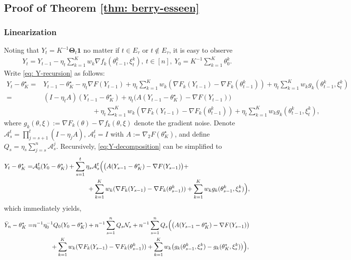 \documentclass[a4paper,11pt]{article}
\numberwithin{equation}{section}
\theoremstyle{plain}
\theoremstyle{remark}
\def\bo{\mathbf{1}}
\def\bT{\mathbf{\Theta}}
\newcommand{\minparam}{\theta^\star_K}
\begin{document}
\subsection{Proof of Theorem \ref{thm: berry-esseen}} \label{se:proof_thm_2.1}

\subsubsection{Linearization} \label{se:linearization}
Noting that $Y_t=K^{-1}\bT_t\bo$ no matter if $t\in E_\tau$ or $t\notin E_\tau$, it is easy to observe
   \begin{align} \label{eq: Y-recursion}
       Y_t = Y_{t-1} - \eta_t \sum_{k=1}^K w_k \nabla f_k(\theta_{t-1}^k, \xi_t^k), \ t\in [n], \ Y_0 =K^{-1}\sum_{k=1}^K \theta_0^k.
   \end{align}
   Write \eqref{eq: Y-recursion} as follows:
   \begin{align} \label{eq:Y-decomposition}
       Y_t - \minparam =& Y_{t-1} - \minparam - \eta_t \nabla F(Y_{t-1}) +\eta_t\sum_{k=1}^K w_k(\nabla F_k(Y_{t-1}) - \nabla F_k(\theta_{t-1}^k)) + \eta_t\sum_{k=1}^K w_k g_k(\theta_{t-1}^k, \xi_t^k) \nonumber \\
        =& (I - \eta_t A)(Y_{t-1} - \minparam) + \eta_t\big(A(Y_{t-1} - \minparam) - \nabla F(Y_{t-1})\big) \nonumber\\
    & \hspace{3cm} + \eta_t \sum_{k=1}^K w_k (\nabla F_k(Y_{t-1}) - \nabla F_k(\theta_{t-1}^k))  + \eta_t \sum_{k=1}^K w_k g_k(\theta_{t-1}^k, \xi_t^k),
   \end{align}
   where $g_k(\theta, \xi):=\nabla F_k(\theta)-\nabla f_k(\theta, \xi)$ denote the gradient noise. Denote $\mathcal{A}_s^t=\prod_{j=s+1}^t (I-\eta_j A)$, $\mathcal{A}_t^t=I$ with $A:=\nabla_2 F(\minparam)$, and define $Q_s=\eta_s \sum_{j=s}^n \mathcal{A}_s^j$. Recursively, \eqref{eq:Y-decomposition} can be simplified to 
\begin{align} \label{eq:Y_final_decomp}
   Y_t - \minparam =& \mathcal{A}_0^t(Y_0 - \minparam)+ \sum_{s=1}^t \eta_s \mathcal{A}_s^t \Big( \big(A(Y_{s-1} - \minparam) - \nabla F(Y_{s-1})\big) + \nonumber\\ & \hspace*{3cm} + \sum_{k=1}^K w_k (\nabla F_k(Y_{s-1}) - \nabla F_k(\theta_{s-1}^k))  + \sum_{k=1}^K w_k g_k(\theta_{s-1}^k, \xi_s^k)\Big),
\end{align}
which immediately yields,
\begin{align} \label{eq:Y-bar-decomp}
    \bar{Y}_n - \minparam=& n^{-1}\eta_0^{-1} Q_0 (Y_0 - \minparam)+ n^{-1} \sum_{s=1}^n Q_s \mathcal{N}_s +    n^{-1}\sum_{s=1}^n Q_s \Big( \big(A(Y_{s-1} - \minparam)  - \nabla F(Y_{s-1})\big) \nonumber\\ & \hspace*{1cm} +  \sum_{k=1}^K w_k (\nabla F_k(Y_{s-1}) - \nabla F_k(\theta_{s-1}^k))  + \sum_{k=1}^K w_k \big(g_k(\theta_{s-1}^k, \xi_s^k)-g_k(\minparam, \xi_s^k)   \big)\Big),
\end{align}
\end{document}
